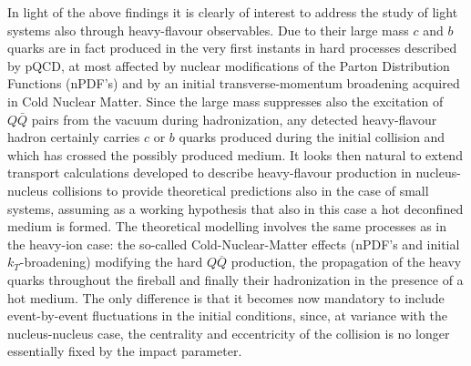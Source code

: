 In light of the above findings it is clearly of interest to address the study of light systems also through heavy-flavour observables. Due to their large mass $c$ and $b$ quarks are in fact produced in the very first instants in hard processes described by pQCD, at most affected by nuclear modifications of the Parton Distribution Functions (nPDF's) and by an initial transverse-momentum broadening acquired in Cold Nuclear Matter. Since the large mass suppresses also the excitation of $Q\bar Q$ pairs from the vacuum during hadronization, any detected heavy-flavour hadron certainly carries $c$ or $b$ quarks produced during the initial collision and which has crossed the possibly produced medium. It looks then natural to extend transport calculations developed to describe heavy-flavour production in nucleus-nucleus collisions to provide theoretical predictions also in the case of small systems, assuming as a working hypothesis that also in this case a hot deconfined medium is formed. The theoretical modelling involves the same processes as in the heavy-ion case: the so-called Cold-Nuclear-Matter effects (nPDF's and initial $k_T$-broadening) modifying the hard $Q\overline{Q}$ production, the propagation of the heavy quarks throughout the fireball and finally their hadronization in the presence of a hot medium. The only difference is that it becomes now mandatory to include event-by-event fluctuations in the initial conditions, since, at variance with the nucleus-nucleus case, the centrality and eccentricity of the collision is no longer essentially fixed by the impact parameter. 

